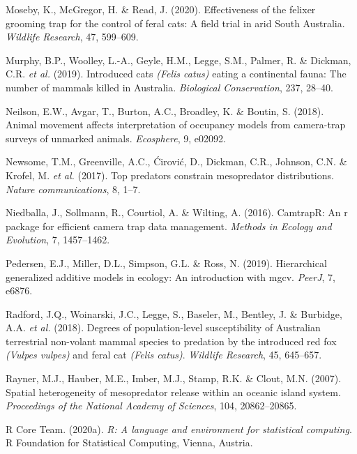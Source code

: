 \documentclass[11pt,a4paper,titlepage,twoside,openright]{style/unimelbthesis}
\begin{document}
\begin{mainmatter}
\leavevmode\hypertarget{ref-moseby2020effectiveness}{}%
Moseby, K., McGregor, H. \& Read, J. (2020). Effectiveness of the felixer grooming trap for the control of feral cats: A field trial in arid South Australia. \emph{Wildlife Research}, 47, 599--609.

\leavevmode\hypertarget{ref-murphy2019introduced}{}%
Murphy, B.P., Woolley, L.-A., Geyle, H.M., Legge, S.M., Palmer, R. \& Dickman, C.R. \emph{et al.} (2019). Introduced cats \emph{(Felis catus)} eating a continental fauna: The number of mammals killed in Australia. \emph{Biological Conservation}, 237, 28--40.

\leavevmode\hypertarget{ref-neilson2018animal}{}%
Neilson, E.W., Avgar, T., Burton, A.C., Broadley, K. \& Boutin, S. (2018). Animal movement affects interpretation of occupancy models from camera-trap surveys of unmarked animals. \emph{Ecosphere}, 9, e02092.

\leavevmode\hypertarget{ref-newsome2017top}{}%
Newsome, T.M., Greenville, A.C., Ćirović, D., Dickman, C.R., Johnson, C.N. \& Krofel, M. \emph{et al.} (2017). Top predators constrain mesopredator distributions. \emph{Nature communications}, 8, 1--7.

\leavevmode\hypertarget{ref-niedballa2016}{}%
Niedballa, J., Sollmann, R., Courtiol, A. \& Wilting, A. (2016). CamtrapR: An r package for efficient camera trap data management. \emph{Methods in Ecology and Evolution}, 7, 1457--1462.

\leavevmode\hypertarget{ref-pedersen2019hierarchical}{}%
Pedersen, E.J., Miller, D.L., Simpson, G.L. \& Ross, N. (2019). Hierarchical generalized additive models in ecology: An introduction with mgcv. \emph{PeerJ}, 7, e6876.

\leavevmode\hypertarget{ref-radford2018degrees}{}%
Radford, J.Q., Woinarski, J.C., Legge, S., Baseler, M., Bentley, J. \& Burbidge, A.A. \emph{et al.} (2018). Degrees of population-level susceptibility of Australian terrestrial non-volant mammal species to predation by the introduced red fox \emph{(Vulpes vulpes)} and feral cat \emph{(Felis catus)}. \emph{Wildlife Research}, 45, 645--657.

\leavevmode\hypertarget{ref-rayner2007spatial}{}%
Rayner, M.J., Hauber, M.E., Imber, M.J., Stamp, R.K. \& Clout, M.N. (2007). Spatial heterogeneity of mesopredator release within an oceanic island system. \emph{Proceedings of the National Academy of Sciences}, 104, 20862--20865.

\leavevmode\hypertarget{ref-r}{}%
R Core Team. (2020a). \emph{R: A language and environment for statistical computing}. R Foundation for Statistical Computing, Vienna, Austria.


\end{mainmatter}
\end{document}
